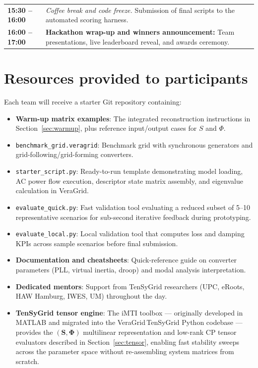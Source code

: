 \documentclass[11pt,a4paper]{article}
\begin{document}
\begin{table}[H]
\begin{tabularx}{\textwidth}{lX}
    \textbf{15:30 -- 16:00}     & \textit{\color{tgpetrol}Coffee break and code freeze.} Submission of final scripts to the automated scoring harness.                                                                      \\
    \textbf{16:00 -- 17:00}     & \textbf{Hackathon wrap-up and winners announcement:} Team presentations, live leaderboard reveal, and awards ceremony.                                                                    \\
    \bottomrule
  \end{tabularx}
\end{table}

\section{Resources provided to participants}

Each team will receive a starter Git repository containing:
\begin{itemize}[leftmargin=*, itemsep=1pt, parsep=0pt]
  \item \textbf{Warm-up matrix examples}: The integrated reconstruction instructions in Section~\ref{sec:warmup}, plus reference input/output cases for $S$ and $\Phi$.
  \item \texttt{benchmark\_grid.veragrid}: Benchmark grid with synchronous generators and grid-following/grid-forming converters.
  \item \texttt{starter\_script.py}: Ready-to-run template demonstrating model loading, AC power flow execution, descriptor state matrix assembly, and eigenvalue calculation in VeraGrid.
  \item \texttt{evaluate\_quick.py}: Fast validation tool evaluating a reduced subset of 5--10 representative scenarios for sub-second iterative feedback during prototyping.
  \item \texttt{evaluate\_local.py}: Local validation tool that computes loss and damping KPIs across sample scenarios before final submission.
  \item \textbf{Documentation and cheatsheets}: Quick-reference guide on converter parameters (PLL, virtual inertia, droop) and modal analysis interpretation.
  \item \textbf{Dedicated mentors}: Support from TenSyGrid researchers (UPC, eRoots, HAW Hamburg, IWES, UM) throughout the day.
  \item \textbf{TenSyGrid tensor engine}: The iMTI toolbox --- originally developed in MATLAB and migrated into the VeraGrid\,TenSyGrid Python codebase --- provides the $(\mathbf{S}, \boldsymbol{\Phi})$ multilinear representation and low-rank CP tensor evaluators described in Section~\ref{sec:tensor}, enabling fast stability sweeps across the parameter space without re-assembling system matrices from scratch.
\end{itemize}
\end{document}
